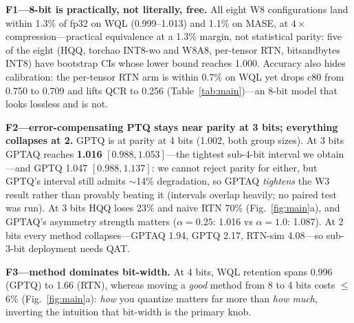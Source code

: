 \documentclass{article}
\begin{document}
\vspace{1pt}\noindent\textbf{F1---8-bit is practically, not literally, free.} All eight W8
configurations land within 1.3\% of fp32 on WQL (0.999--1.013) and 1.1\% on MASE, at
$4\times$ compression---practical equivalence at a 1.3\% margin, not statistical parity:
five of the eight (HQQ, torchao INT8-wo and W8A8, per-tensor RTN, bitsandbytes INT8) have
bootstrap CIs whose lower bound reaches 1.000. Accuracy also hides calibration: the
per-tensor RTN arm is within 0.7\% on WQL yet drops c80 from 0.750 to 0.709 and lifts QCR
to 0.256 (Table~\ref{tab:main})---an 8-bit model that looks lossless and is not.

\vspace{1pt}\noindent\textbf{F2---error-compensating PTQ stays near parity at 3 bits;
everything collapses at 2.} GPTQ is at parity at 4 bits (1.002, both group sizes). At 3
bits GPTAQ reaches \textbf{1.016} $[0.988,1.053]$---the tightest sub-4-bit interval we
obtain---and GPTQ 1.047 $[0.988,1.137]$: we cannot reject parity for either, but GPTQ's
interval still admits $\sim$14\% degradation, so GPTAQ \emph{tightens} the W3 result
rather than provably beating it (intervals overlap heavily; no paired test was run). At
3 bits HQQ loses 23\% and naive RTN 70\% (Fig.~\ref{fig:main}a), and GPTAQ's asymmetry
strength matters ($\alpha{=}0.25$: 1.016 vs $\alpha{=}1.0$: 1.087). At 2 bits every
method collapses---GPTAQ 1.94, GPTQ 2.17, RTN-sim 4.08---so sub-3-bit deployment needs
QAT.

\vspace{1pt}\noindent\textbf{F3---method dominates bit-width.} At 4 bits, WQL retention
spans 0.996 (GPTQ) to 1.66 (RTN), whereas moving a \emph{good} method from 8 to 4 bits
costs $\le$6\% (Fig.~\ref{fig:main}a): \emph{how} you quantize matters far more than
\emph{how much}, inverting the intuition that bit-width is the primary knob.
\end{document}
